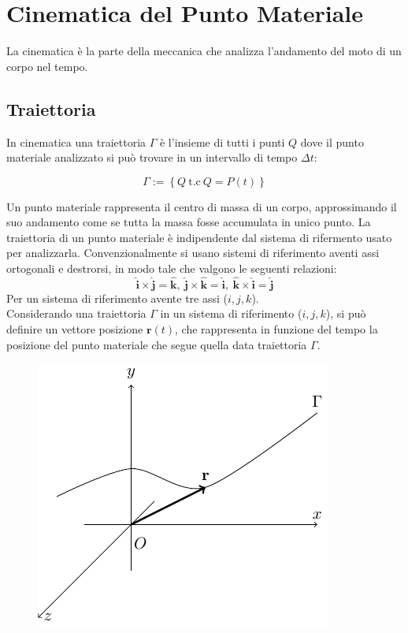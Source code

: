 \documentclass{article}
\newcommand{\vect}[1]{\boldsymbol{\mathbf{#1}}}
\numberwithin{equation}{subsection}
\begin{document}
\clearpage

\section{Cinematica del Punto Materiale}
La cinematica è la parte della meccanica che analizza l'andamento del moto di un 
corpo nel tempo. 

\subsection{Traiettoria}
In cinematica una traiettoria $\Gamma$ è l'insieme di tutti i punti $Q$ dove 
il punto materiale analizzato si può trovare in un intervallo di tempo $\Delta t$:

\begin{equation}
    \Gamma := \left\{Q\:\mbox{t.c}\: Q = P(t)\right\}
\end{equation}


Un punto materiale rappresenta il centro di massa di un corpo, approssimando
il suo andamento come se tutta la massa fosse accumulata in unico punto.
La traiettoria di un punto materiale è indipendente dal sistema di rifermento usato
per analizzarla. Convenzionalmente si usano sistemi di riferimento aventi
assi ortogonali e destrorsi, in modo tale che valgono le seguenti relazioni: 
\begin{equation}
    \hat{\vect{i}}\times\hat{\vect{j}} = \hat{\vect{k}},\:\hat{\vect{j}}\times\hat{\vect{k}} = \hat{\vect{i}},\: \hat{\vect{k}}\times\hat{\vect{i}} = \hat{\vect{j}}
\end{equation}
Per un sistema di 
riferimento avente tre assi ($i, j, k$).
\\
Considerando una traiettoria $\Gamma$ in un sistema di riferimento ($i,j,k$),
si può definire un vettore posizione $\vect{r}(t)$, che rappresenta in 
funzione del tempo la posizione del punto materiale che segue quella data
traiettoria $\Gamma$.

\begin{figure}[H]%
    \centering
    \includegraphics{traiettoria.pdf}%
\end{figure}
\end{document}
